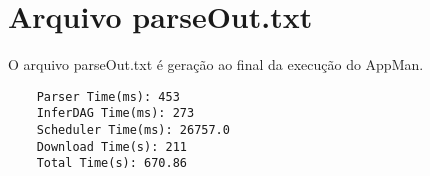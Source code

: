 \chapter{Arquivo parseOut.txt}
\label{anexo:parser}

O arquivo parseOut.txt é geração ao final da execução do AppMan.

\begin{scriptsize}
\begin{verbatim}
	Parser Time(ms): 453
	InferDAG Time(ms): 273
	Scheduler Time(ms): 26757.0
	Download Time(s): 211
	Total Time(s): 670.86
\end{verbatim}
\end{scriptsize}